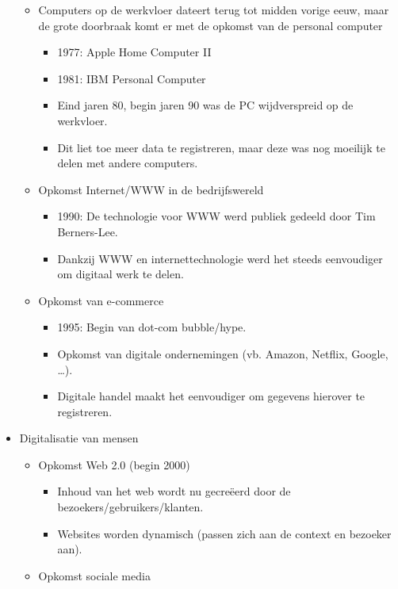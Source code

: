 \documentclass[]{tufte-book}
\providecommand{\tightlist}{%
  \setlength{\itemsep}{0pt}\setlength{\parskip}{0pt}}
\begin{document}
\begin{itemize}
  \begin{itemize}
  \tightlist
  \item
    Computers op de werkvloer dateert terug tot midden vorige eeuw, maar de grote doorbraak komt er met de opkomst van de personal computer

    \begin{itemize}
    \tightlist
    \item
      1977: Apple Home Computer II
    \item
      1981: IBM Personal Computer
    \item
      Eind jaren 80, begin jaren 90 was de PC wijdverspreid op de werkvloer.
    \item
      Dit liet toe meer data te registreren, maar deze was nog moeilijk te delen met andere computers.
    \end{itemize}
  \item
    Opkomst Internet/WWW in de bedrijfswereld

    \begin{itemize}
    \tightlist
    \item
      1990: De technologie voor WWW werd publiek gedeeld door Tim Berners-Lee.
    \item
      Dankzij WWW en internettechnologie werd het steeds eenvoudiger om digitaal werk te delen.
    \end{itemize}
  \item
    Opkomst van e-commerce

    \begin{itemize}
    \tightlist
    \item
      1995: Begin van dot-com bubble/hype.
    \item
      Opkomst van digitale ondernemingen (vb. Amazon, Netflix, Google, \ldots).
    \item
      Digitale handel maakt het eenvoudiger om gegevens hierover te registreren.
    \end{itemize}
  \end{itemize}
\item
  Digitalisatie van mensen

  \begin{itemize}
  \tightlist
  \item
    Opkomst Web 2.0 (begin 2000)

    \begin{itemize}
    \tightlist
    \item
      Inhoud van het web wordt nu gecreëerd door de bezoekers/gebruikers/klanten.
    \item
      Websites worden dynamisch (passen zich aan de context en bezoeker aan).
    \end{itemize}
  \item
    Opkomst sociale media


\end{itemize}
\end{itemize}
\end{document}
